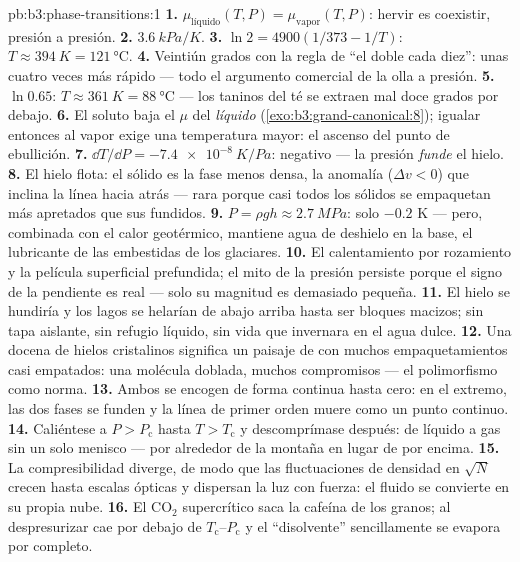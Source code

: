 \begin{solution}{pb:b3:phase-transitions:1}
\textbf{1.} $\mu_{\text{líquido}}(T, P) = \mu_{\text{vapor}}(T,
P)$: hervir es coexistir, presión a presión.
\textbf{2.} $\qty{3.6}{kPa/K}$.
\textbf{3.} $\ln2 = 4900(1/373 - 1/T)$: $T \approx \qty{394}{K} =
\qty{121}{\celsius}$.
\textbf{4.} Veintiún grados con la regla de ``el doble cada diez'': unas cuatro
veces más rápido --- todo el argumento comercial de la olla a presión.
\textbf{5.} $\ln0.65$: $T \approx \qty{361}{K} =
\qty{88}{\celsius}$ --- los taninos del té se extraen mal doce grados
por debajo.
\textbf{6.} El soluto baja el $\mu$ del \emph{líquido}
(\cref{exo:b3:grand-canonical:8}); igualar entonces al vapor exige
una temperatura mayor: el ascenso del punto de ebullición.
\textbf{7.} $\dd T/\dd P = \qty{-7.4e-8}{K/Pa}$: negativo ---
la presión \emph{funde} el hielo.
\textbf{8.} El hielo flota: el sólido es la fase menos densa, la
anomalía ($\Delta v < 0$) que inclina la línea hacia atrás --- rara
porque casi todos los sólidos se empaquetan más apretados que sus fundidos.
\textbf{9.} $P = \rho gh \approx \qty{2.7}{MPa}$: solo
$-0.2$ K --- pero, combinada con el calor geotérmico, mantiene agua de deshielo
en la base, el lubricante de las embestidas de los glaciares.
\textbf{10.} El calentamiento por rozamiento y la película superficial prefundida;
el mito de la presión persiste porque el signo de la pendiente es real
--- solo su magnitud es demasiado pequeña.
\textbf{11.} El hielo se hundiría y los lagos se helarían de abajo arriba
hasta ser bloques macizos; sin tapa aislante, sin refugio líquido, sin
vida que invernara en el agua dulce.
\textbf{12.} Una docena de hielos cristalinos significa un paisaje de  con muchos empaquetamientos casi empatados: una molécula doblada,
muchos compromisos --- el polimorfismo como norma.
\textbf{13.} Ambos se encogen de forma continua hasta cero: en el extremo,
las dos fases se funden y la línea de primer orden muere como un
punto continuo.
\textbf{14.} Caliéntese a $P > P_{\text{c}}$ hasta $T > T_{\text{c}}$
y descomprímase después: de líquido a gas sin un solo menisco --- por
alrededor de la montaña en lugar de por encima.
\textbf{15.} La compresibilidad diverge, de modo que las fluctuaciones de densidad
en $\sqrt N$ crecen hasta escalas ópticas y dispersan la luz con fuerza:
el fluido se convierte en su propia nube.
\textbf{16.} El CO$_2$ supercrítico saca la cafeína de los granos;
al despresurizar cae por debajo de $T_{\text{c}}$--$P_{\text{c}}$ y el
``disolvente'' sencillamente se evapora por completo.

\end{solution}

